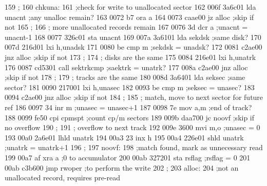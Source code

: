 159                ;
160                chkuna:
161                          ;check for write to unallocated sector
162    006f 3a6c01           lda      unacnt                 ;any unalloc remain?
163    0072 b7               ora      a
164    0073 caae00           jz       alloc                  ;skip if not
165                ;
166                ;         more unallocated records remain
167    0076 3d               dcr      a                      ;unacnt = unacnt-1
168    0077 326c01           sta      unacnt
169    007a 3a6101           lda      sekdsk                 ;same disk?
170    007d 216d01           lxi      h,unadsk
171    0080 be               cmp      m                      ;sekdsk = unadsk?
172    0081 c2ae00           jnz      alloc                  ;skip if not
173                ;
174                ;         disks are the same
175    0084 216e01           lxi      h,unatrk
176    0087 cd5301           call     sektrkcmp              ;saektrk = unatrk?
177    008a c2ae00           jnz      alloc                  ;skip if not
178                ;
179                ;         tracks are the same
180    008d 3a6401           lda      seksec                 ;same sector?
181    0090 217001           lxi      h,unasec
182    0093 be               cmp      m                      ;seksec = unasec?
183    0094 c2ae00           jnz      alloc                  ;skip if not
184                ;
185                ;         match, move to next sector for future ref
186    0097 34               inr      m                      ;unasec = unasec+1
187    0098 7e               mov      a,m                    ;end of track?
188    0099 fe50             cpi      cpmspt                 ;count cp/m sectors
189    009b daa700           jc       noovf                  ;skip if no overflow
190                ;
191                ;         overflow to next track
192    009e 3600             mvi      m,o                    ;unasec = 0
193    00a0 2a6e01           lhld     unatrk
194    00a3 23               inx      h
195    00a4 226e01           shld     unatrk                 ;unatrk = unatrk+1
196                ;
197                noovf:
198                          ;match found, mark as unnecessary read
199    00a7 af               xra      a                      ;0 to accumulator
200    00ab 327201           sta      rsflag                 ;rsflag = 0
201    00ab c3b600           jmp      rwoper                 ;to perform the write
202                ;
203                alloc:
204                          ;not an unallocated record, requires pre-read
